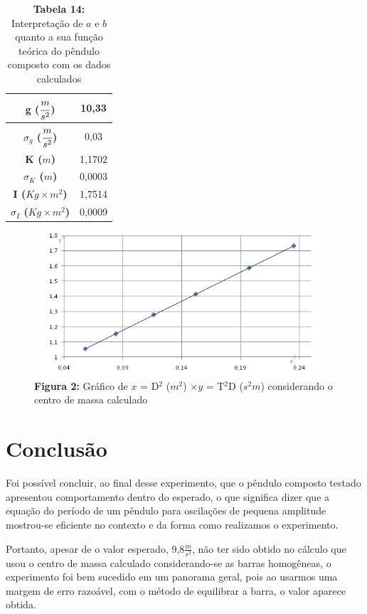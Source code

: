 \documentclass{article}
\begin{document}
\begin{table}[!ht]
	\begin{center}
		\caption*{\textbf{Tabela 14:} Interpretação de $a$ e $b$ quanto a sua função teórica do pêndulo composto com os dados calculados}
		\begin{tabular}{| c | c |}
			\hline 
			\multicolumn{0}{|c|}{\textbf{g ($\cfrac{m}{s^2}$)}} & 10,33 \\ \hline
			\multicolumn{0}{|c|}{\textbf{$\sigma_g$ ($\cfrac{m}{s^2}$)}} & 0,03 \\ \hline
			\multicolumn{0}{|c|}{\textbf{K ($m$)}} & 1,1702 \\ \hline
			\multicolumn{0}{|c|}{\textbf{$\sigma_K$ ($m$)}} & 0,0003 \\ \hline
			\multicolumn{0}{|c|}{\textbf{I ($Kg\times m^2$)}} & 1,7514\\ \hline
			\multicolumn{0}{|c|}{\textbf{$\sigma_I$ ($Kg\times m^2$)}} & 0,0009 \\ \hline
		\end{tabular}
	\end{center}
\end{table}

\afterpage{\clearpage}

\begin{figure}[!ht]
 	\centering
		\includegraphics[width=0.95\textwidth]{calculado}
	\caption*{\textbf{Figura 2:} Gráfico de $x$ = D$^2$ ($m^2$) $\times y$ =  T$^2$D ($s^2m$) considerando o centro de massa calculado}
\end{figure}


\section{Conclusão}

Foi possível concluir, ao final desse experimento, que o pêndulo composto testado apresentou comportamento dentro do esperado, o que significa dizer que a equação do período de um pêndulo para oscilações de pequena amplitude mostrou-se eficiente no contexto e da forma como realizamos o experimento. 

Portanto, apesar de o valor esperado, 9,8$\frac{m}{s^2}$, não ter sido obtido no cálculo que usou o centro de massa calculado considerando-se as barras homogêneas, o experimento foi bem sucedido em um panorama geral, pois ao usarmos uma margem de erro razoável, com o método de equilibrar a barra, o valor aparece obtida.
\end{document}
